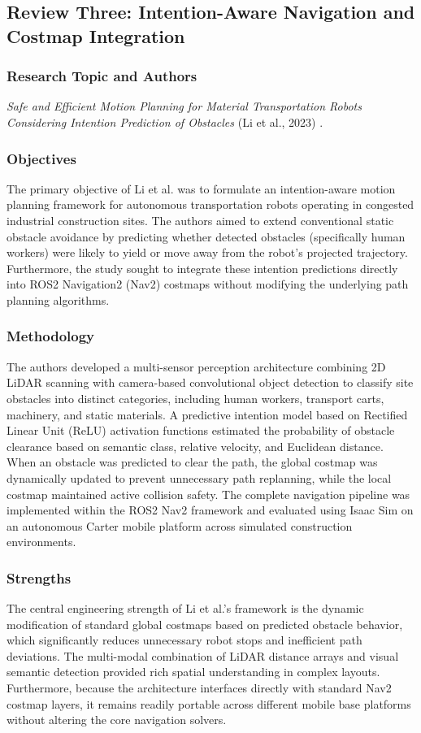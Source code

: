 \subsection{Review Three: Intention-Aware Navigation and Costmap Integration}

\subsubsection{Research Topic and Authors}
\textit{Safe and Efficient Motion Planning for Material Transportation Robots Considering Intention Prediction of Obstacles} (Li et al., 2023) \cite{li2023}.

\subsubsection{Objectives}
The primary objective of Li et al. was to formulate an intention-aware motion planning framework for autonomous transportation robots operating in congested industrial construction sites. The authors aimed to extend conventional static obstacle avoidance by predicting whether detected obstacles (specifically human workers) were likely to yield or move away from the robot's projected trajectory. Furthermore, the study sought to integrate these intention predictions directly into ROS2 Navigation2 (Nav2) costmaps without modifying the underlying path planning algorithms.

\subsubsection{Methodology}
The authors developed a multi-sensor perception architecture combining 2D LiDAR scanning with camera-based convolutional object detection to classify site obstacles into distinct categories, including human workers, transport carts, machinery, and static materials. A predictive intention model based on Rectified Linear Unit (ReLU) activation functions estimated the probability of obstacle clearance based on semantic class, relative velocity, and Euclidean distance. When an obstacle was predicted to clear the path, the global costmap was dynamically updated to prevent unnecessary path replanning, while the local costmap maintained active collision safety. The complete navigation pipeline was implemented within the ROS2 Nav2 framework and evaluated using Isaac Sim on an autonomous Carter mobile platform across simulated construction environments.

\subsubsection{Strengths}
The central engineering strength of Li et al.'s framework is the dynamic modification of standard global costmaps based on predicted obstacle behavior, which significantly reduces unnecessary robot stops and inefficient path deviations. The multi-modal combination of LiDAR distance arrays and visual semantic detection provided rich spatial understanding in complex layouts. Furthermore, because the architecture interfaces directly with standard Nav2 costmap layers, it remains readily portable across different mobile base platforms without altering the core navigation solvers.

